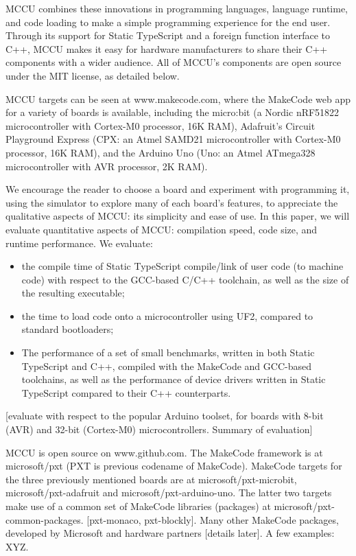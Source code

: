 MCCU combines these innovations in programming languages, language runtime, and code loading to make a simple 
programming experience for the end user.  Through its support for Static TypeScript and a foreign function 
interface to C++, MCCU makes it easy for hardware manufacturers to share their C++ components with a wider audience.  
All of MCCU’s components are open source under the MIT license, as detailed below. 

MCCU targets can be seen at www.makecode.com, where the MakeCode web app for a variety of boards is available, 
including the micro:bit (a Nordic nRF51822 microcontroller with Cortex-M0 processor, 16K RAM), Adafruit’s Circuit 
Playground Express (CPX: an Atmel SAMD21 microcontroller with Cortex-M0 processor, 16K RAM), and the Arduino Uno 
(Uno: an Atmel ATmega328 microcontroller with AVR processor, 2K RAM). 

We encourage the reader to choose a board and experiment with programming it, using the simulator to explore many of each board’s features, 
to appreciate the qualitative aspects of MCCU: its simplicity and ease of use.  In this paper, we will evaluate quantitative aspects of MCCU: 
compilation speed, code size, and runtime performance.  We evaluate:
\begin{itemize}
\item the compile time of Static TypeScript compile/link of user code (to machine code) with respect to the GCC-based C/C++ toolchain, as well as the size of the resulting executable;
\item the time to load code onto a microcontroller using UF2, compared to standard bootloaders; 
\item The performance of a set of small benchmarks, written in both Static TypeScript and C++, compiled with the MakeCode and GCC-based toolchains, as well as the performance of device drivers written in Static TypeScript compared to their C++ counterparts.
\end{itemize}
[evaluate with respect to the popular Arduino toolset, for boards with 8-bit (AVR) and 32-bit (Cortex-M0) microcontrollers. 
Summary of evaluation]

MCCU is open source on www.github.com. The MakeCode framework is at microsoft/pxt (PXT is previous codename of MakeCode). 
MakeCode targets for the three previously mentioned boards are at microsoft/pxt-microbit, microsoft/pxt-adafruit and 
microsoft/pxt-arduino-uno. The latter two targets make use of a common set of MakeCode libraries (packages) at 
microsoft/pxt-common-packages. [pxt-monaco, pxt-blockly].   Many other MakeCode packages, developed by Microsoft and 
hardware partners [details later]. A few examples: XYZ.  

